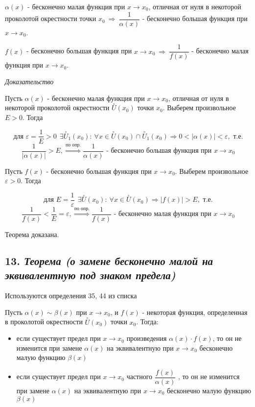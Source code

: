 $\alpha(x)$ - бесконечно малая функция при $x \rightarrow x_0$, отличная от нуля в некоторой проколотой окрестности точки $x_0 \ \Rightarrow \ {\dfrac{1}{\alpha(x)}}$ - бесконечно большая функция при $x \rightarrow x_0$.

$f(x)$ - бесконечно большая функция при $x \rightarrow x_0 \ \Rightarrow \ {\dfrac{1}{f(x)}}$ - бесконечно малая функция при $x \rightarrow x_0$.
\vspace*{20pt} 

\textit{Доказательство}

Пусть $\alpha(x)$ - бесконечно малая функция при $x \rightarrow x_0$, отличная от нуля в некоторой проколотой окрестности $\overset{\circ}U(x_0)$ точки $x_0$. Выберем произвольное $E > 0$. Тогда

$$
\text{для } {\varepsilon} = \dfrac{1}{E} > 0 \ \ \exists \overset{\circ}U_1(x_0): \ \forall x \in \overset{\circ}U(x_0) \cap \overset{\circ}U_1(x_0) \Rightarrow 0 < |\alpha(x)| < {\varepsilon}, \text{ т.е.}
$$ $$
\dfrac{1}{|\alpha(x)|} > E, \overset{\text{по опр.}}\Rightarrow \dfrac{1}{\alpha(x)} \text{ - бесконечно большая функция при } x \rightarrow x_0 
$$

Пусть $f(x)$ - бесконечно большая функция при $x \rightarrow x_0$. Выберем произвольное ${\varepsilon} > 0$. Тогда

$$
\text{для } E = \dfrac{1}{{\varepsilon}} \ \ \exists \overset{\circ}U(x_0): \ \forall x \in \overset{\circ}U(x_0) \Rightarrow |f(x)| > E, \text{ т.е.}
$$ $$
\dfrac{1}{f(x)} < \dfrac{1}{E} = {\varepsilon}, \overset{\text{по опр.}}\Rightarrow \dfrac{1}{f(x)} \text{ - бесконечно малая функция при } x \rightarrow x_0 
$$

Теорема доказана.
\newpage 
\subsection*{13. \textit{Теорема (о замене бесконечно малой на эквивалентную под знаком предела)}}
\begin{Quote2} 
\small\centering 

Используются определения 35, 44 из списка \end{Quote2} 

Пусть $\alpha(x)\sim\beta(x)$ при $x \rightarrow x_0$, и $f(x)$ - некоторая функция, определенная в проколотой окрестности $\overset{\circ}U(x_0)$ точки $x_0$. Тогда:
\begin{itemize}

\item если существует предел при $x \rightarrow x_0$ произведения $\alpha(x)\cdot f(x)$, то он не изменится при замене $\alpha(x)$ на эквивалентную при $x \rightarrow x_0$ бесконечно малую функцию $\beta(x)$
\item если существует предел при $x \rightarrow x_0$ частного ${\dfrac{f(x)}{\alpha(x)}}$ , то он не изменится при замене $\alpha(x)$ на эквивалентную при $x \rightarrow x_0$ бесконечно малую функцию $\beta(x)$

\end{itemize}
\vspace*{20pt} 


